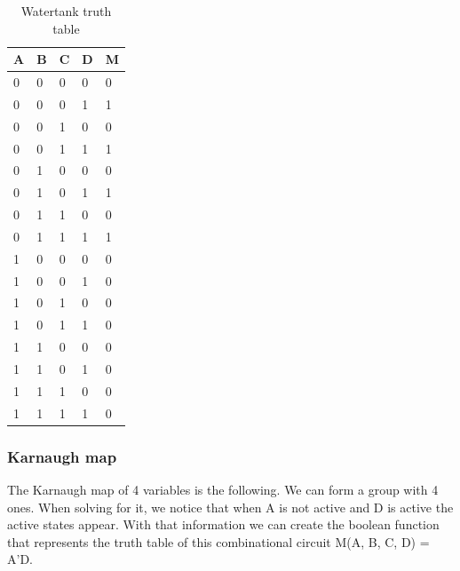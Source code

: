 \documentclass{article}
\begin{document}
\begin{multicols}{2}
	\begin{table}[H]
		\centering
		\caption{Watertank truth table}
		\vspace*{1em}
		\begin{tabular}{|l|l|l|l|l|}
			\hline
			A & B & C & D & M \\ \hline
			0 & 0 & 0 & 0 & 0 \\ \hline
			0 & 0 & 0 & 1 & 1 \\ \hline
			0 & 0 & 1 & 0 & 0 \\ \hline
			0 & 0 & 1 & 1 & 1 \\ \hline
			0 & 1 & 0 & 0 & 0 \\ \hline
			0 & 1 & 0 & 1 & 1 \\ \hline
			0 & 1 & 1 & 0 & 0 \\ \hline
			0 & 1 & 1 & 1 & 1 \\ \hline
			1 & 0 & 0 & 0 & 0 \\ \hline
			1 & 0 & 0 & 1 & 0 \\ \hline
			1 & 0 & 1 & 0 & 0 \\ \hline
			1 & 0 & 1 & 1 & 0 \\ \hline
			1 & 1 & 0 & 0 & 0 \\ \hline
			1 & 1 & 0 & 1 & 0 \\ \hline
			1 & 1 & 1 & 0 & 0 \\ \hline
			1 & 1 & 1 & 1 & 0 \\ \hline
		\end{tabular}
	\end{table}

	\subsubsection*{Karnaugh map}\label{Watertank Karnaugh map}

	The Karnaugh map of 4 variables is the following. We can form a group with 4 ones. When solving for it, we notice that when A is not active and D is active the active states appear. With that information we can create the boolean function that represents the truth table of this combinational circuit M(A, B, C, D) = A'D.


\end{multicols}
\end{document}
